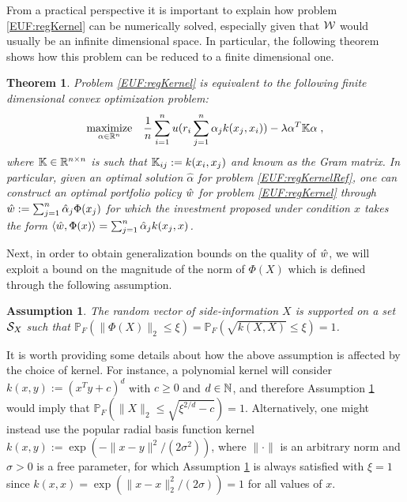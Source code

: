 \documentclass[]{interact}
\theoremstyle{plain}%
\theoremstyle{definition}
\theoremstyle{remark}
\def\Prob{{\mathbb P}}
\def\maximize{\mathop{\rm maximize}}
\newcommand{\0}{\V{0}}
\newcommand{\1}{\V{1}}
\renewcommand{\Re}{\mathbb{R}}
\theoremstyle{plain}
\newtheorem{thm}{Theorem}
\newtheorem{assumption}{Assumption}
\theoremstyle{definition}
\begin{document}
From a practical perspective it is important to explain how problem \eqref{EUF:regKernel} can be numerically solved, especially given that ${\mathcal{W}}$ would usually be an infinite dimensional space. In particular, the following theorem shows how this problem can be reduced to a finite dimensional one.

\begin{thm}\label{thm:kernelreform}
Problem \eqref{EUF:regKernel} is equivalent to the following finite dimensional convex optimization problem:
\begin{equation}
 \maximize_{\alpha\in\Re^n}\;\;\;\frac{1}{n}\sum_{i=1}^n u(r_i \sum_{j=1}^n \alpha_j k(x_j,x_i)) - \lambda \alpha^T \Gram \alpha\;,\label{EUF:regKernelRef}
\end{equation}
where $\Gram\in \Re^{n\times n}$ is such that ${\mathbb{K}}_{ij}:=k(x_i,x_j)$ and known as the Gram matrix. In particular, given an optimal solution $\hat{\alpha}$ for problem \eqref{EUF:regKernelRef}, one can construct an optimal portfolio policy ${\hat{w}}$ for problem \eqref{EUF:regKernel} through ${\hat{w}}:=\sum_{j=1}^n \hat{\alpha}_j \Phi(x_j)$ for which the investment proposed under condition $x$ takes the form $\langle {\hat{w}}, \Phi(x)\rangle =\sum_{j=1}^n \hat{\alpha}_j k(x_j,x)$.
\end{thm}



Next, in order to obtain generalization bounds on the quality of ${\hat{w}}$, we will exploit a bound on the magnitude of the norm of $\Phi(X)$ which is defined through the following assumption.

\begin{assumption}\label{ass:kernel}
  The random vector of side-information $X$ is supported on a set ${\mathcal{S}_X}$ such that
  $\Prob_F(\|\Phi(X)\|_2\leq \xi)=\Prob_F(\sqrt{k(X,X)}\leq \xi)=1$.
\end{assumption}

It is worth providing some details about how the above assumption is affected by the choice of kernel. For instance, a polynomial kernel will consider $k(x,y):=(x^T y+c)^d$ with $c\geq 0$ and $d\in{\mathbb{N}}$, and therefore Assumption \ref{ass:kernel} would imply that $\Prob_F(\|X\|_2\leq \sqrt{\xi^{2/d}-c})=1$. Alternatively, one might instead use the popular radial basis function kernel $k(x,y):=\exp(-\|x-y\|^2/(2\sigma^2))$, where $\|\cdot\|$ is an arbitrary norm and $\sigma>0$ is a free parameter,  for which Assumption \ref{ass:kernel} is always satisfied with $\xi=1$  since $k(x,x)=\exp(\|x-x\|_2^2/(2\sigma))=1$ for all values of $x$.
\end{document}
